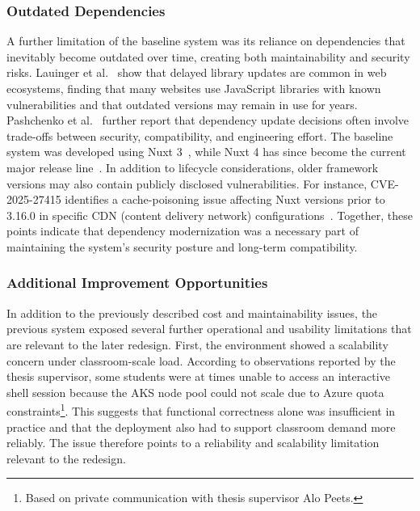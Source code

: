 \subsubsection{Outdated Dependencies} \label{subsubsec:outdated-dependencies}
A further limitation of the baseline system was its reliance on dependencies that inevitably become outdated over time, creating both maintainability and security risks.
Lauinger et al.~\cite{lauinger_thou_2017} show that delayed library updates are common in web ecosystems, finding that many websites use JavaScript libraries with known vulnerabilities and that outdated versions may remain in use for years.
Pashchenko et al.~\cite{pashchenko_qualitative_2020} further report that dependency update decisions often involve trade-offs between security, compatibility, and engineering effort.
The baseline system was developed using Nuxt 3~\cite{eistre_2024}, while Nuxt 4 has since become the current major release line~\cite{nuxt_roadmap}.
In addition to lifecycle considerations, older framework versions may also contain publicly disclosed vulnerabilities.
For instance, CVE-2025-27415 identifies a cache-poisoning issue affecting Nuxt versions prior to 3.16.0 in specific CDN (content delivery network) configurations~\cite{nvd_cve_2025_27415}.
Together, these points indicate that dependency modernization was a necessary part of maintaining the system's security posture and long-term compatibility.

\subsubsection{Additional Improvement Opportunities} \label{subsubsec:additional-improvement-opportunities}
In addition to the previously described cost and maintainability issues, the previous system exposed several further operational and usability limitations that are relevant to the later redesign.
First, the environment showed a scalability concern under classroom-scale load.
According to observations reported by the thesis supervisor, some students were at times unable to access an interactive shell session because the AKS node pool could not scale due to Azure quota constraints\footnote{Based on private communication with thesis supervisor Alo Peets.}.
This suggests that functional correctness alone was insufficient in practice and that the deployment also had to support classroom demand more reliably.
The issue therefore points to a reliability and scalability limitation relevant to the redesign.

